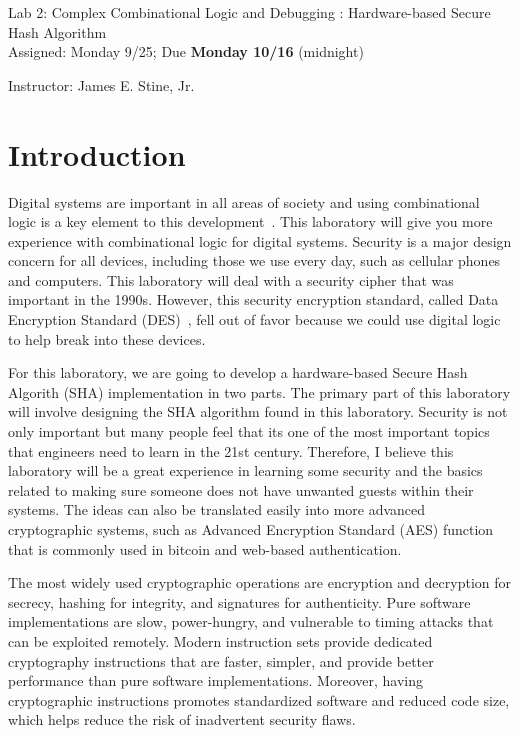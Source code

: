\documentclass{article}
\newcommand{\myassignment}{Lab 2: Complex Combinational Logic and Debugging : Hardware-based Secure Hash Algorithm}
\newcommand{\myduedate}{Assigned: Monday 9/25; Due \textbf{Monday 10/16} (midnight)}
\newcommand{\myinstructor}{Instructor: James E. Stine, Jr.}
\begin{document}
\begin{center}
  {\huge \myassignment} \\
  {\large \myduedate} \\
  \begin{flushright}
  \myinstructor \\
  \end{flushright}
\end{center}

\section{Introduction}

Digital systems are important in all areas of society and using
combinational logic is a key element to this
development~\cite{ddca-riscv}.  This
laboratory will give you more experience with combinational logic
for digital systems.  
Security is a major design concern for all devices, including those  we
use every day, such as cellular phones and computers.
This laboratory will deal with a security cipher that was important in
the 1990s.  However, this security encryption standard, called Data
Encryption Standard (DES)~\cite{fips463, Biryukov2005}, fell out of
favor because we
could use
digital logic to help break into these devices.

For this laboratory, we are going to develop a hardware-based Secure Hash Algorith (SHA)
implementation
in two parts.  The primary part of this laboratory will involve designing the 
SHA algorithm found in this laboratory.
Security is not only important but many people feel that its one of the most important
topics that engineers
need to learn in the 21st century.  Therefore, I
believe this laboratory will be a great experience in learning some
security and the basics related to making sure someone does not have
unwanted guests within their systems.  The ideas can also be
translated easily into more advanced cryptographic systems, such as
Advanced Encryption Standard (AES) function that is
commonly used in bitcoin and web-based authentication.

The most widely used cryptographic operations are encryption and
decryption for secrecy, hashing for integrity, and signatures for
authenticity. Pure software implementations are slow, power-hungry,
and vulnerable to timing attacks that can be exploited
remotely. Modern instruction sets provide dedicated cryptography
instructions that are faster, simpler, and provide better performance
than pure software implementations. Moreover, having cryptographic
instructions promotes standardized software and reduced code size,
which helps reduce the risk of inadvertent security flaws. 
\end{document}
